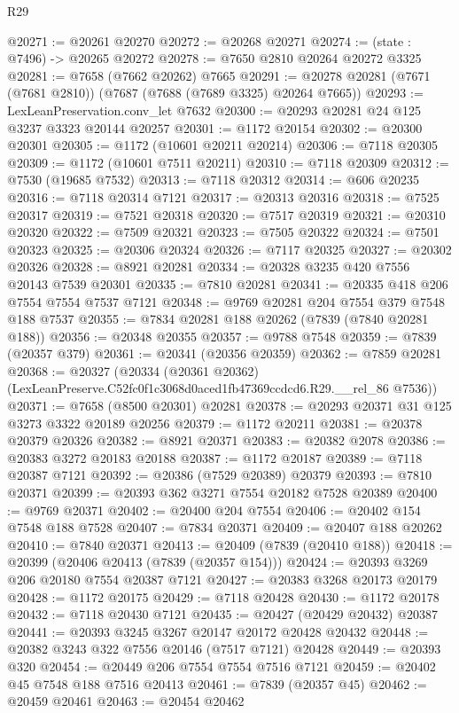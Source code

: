 \begin{lexlean}{R29}
\begin{coremodule}
@20271 := @20261 @20270
@20272 := @20268 @20271
@20274 := (state : @7496) -> @20265 @20272
@20278 := @7650 @2810 @20264 @20272 @3325
@20281 := @7658 (@7662 @20262) @7665
@20291 := @20278 @20281 (@7671 (@7681 @2810)) (@7687 (@7688 (@7689 @3325) @20264 @7665))
@20293 := LexLeanPreservation.conv_let @7632
@20300 := @20293 @20281 @24 @125 @3237 @3323 @20144 @20257
@20301 := @1172 @20154
@20302 := @20300 @20301
@20305 := @1172 (@10601 @20211 @20214)
@20306 := @7118 @20305
@20309 := @1172 (@10601 @7511 @20211)
@20310 := @7118 @20309
@20312 := @7530 (@19685 @7532)
@20313 := @7118 @20312
@20314 := @606 @20235
@20316 := @7118 @20314 @7121
@20317 := @20313 @20316
@20318 := @7525 @20317
@20319 := @7521 @20318
@20320 := @7517 @20319
@20321 := @20310 @20320
@20322 := @7509 @20321
@20323 := @7505 @20322
@20324 := @7501 @20323
@20325 := @20306 @20324
@20326 := @7117 @20325
@20327 := @20302 @20326
@20328 := @8921 @20281
@20334 := @20328 @3235 @420 @7556 @20143 @7539 @20301
@20335 := @7810 @20281
@20341 := @20335 @418 @206 @7554 @7554 @7537 @7121
@20348 := @9769 @20281 @204 @7554 @379 @7548 @188 @7537
@20355 := @7834 @20281 @188 @20262 (@7839 (@7840 @20281 @188))
@20356 := @20348 @20355
@20357 := @9788 @7548
@20359 := @7839 (@20357 @379)
@20361 := @20341 (@20356 @20359)
@20362 := @7859 @20281
@20368 := @20327
    (@20334 (@20361 @20362) (LexLeanPreserve.C52fc0f1c3068d0aced1fb47369ccdcd6.R29.__rel_86 @7536))
@20371 := @7658 (@8500 @20301) @20281
@20378 := @20293 @20371 @31 @125 @3273 @3322 @20189 @20256
@20379 := @1172 @20211
@20381 := @20378 @20379 @20326
@20382 := @8921 @20371
@20383 := @20382 @2078
@20386 := @20383 @3272 @20183 @20188
@20387 := @1172 @20187
@20389 := @7118 @20387 @7121
@20392 := @20386 (@7529 @20389) @20379
@20393 := @7810 @20371
@20399 := @20393 @362 @3271 @7554 @20182 @7528 @20389
@20400 := @9769 @20371
@20402 := @20400 @204 @7554
@20406 := @20402 @154 @7548 @188 @7528
@20407 := @7834 @20371
@20409 := @20407 @188 @20262
@20410 := @7840 @20371
@20413 := @20409 (@7839 (@20410 @188))
@20418 := @20399 (@20406 @20413 (@7839 (@20357 @154)))
@20424 := @20393 @3269 @206 @20180 @7554 @20387 @7121
@20427 := @20383 @3268 @20173 @20179
@20428 := @1172 @20175
@20429 := @7118 @20428
@20430 := @1172 @20178
@20432 := @7118 @20430 @7121
@20435 := @20427 (@20429 @20432) @20387
@20441 := @20393 @3245 @3267 @20147 @20172 @20428 @20432
@20448 := @20382 @3243 @322 @7556 @20146 (@7517 @7121) @20428
@20449 := @20393 @320
@20454 := @20449 @206 @7554 @7554 @7516 @7121
@20459 := @20402 @45 @7548 @188 @7516 @20413
@20461 := @7839 (@20357 @45)
@20462 := @20459 @20461
@20463 := @20454 @20462

\end{coremodule}
\end{lexlean}
